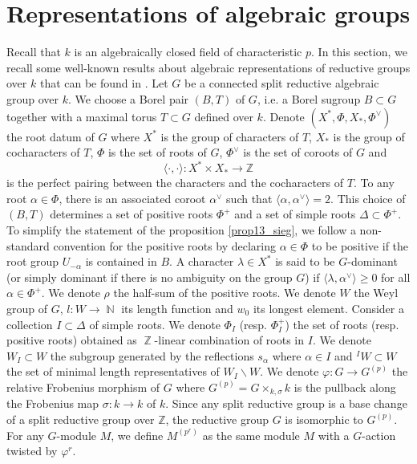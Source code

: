 \documentclass[11pt]{amsart}
\numberwithin{subsection}{section}
\numberwithin{figure}{section}
\numberwithin{table}{section}
\theoremstyle{1}
\theoremstyle{2}
\DeclareMathOperator{\Z}{\mathbb{Z}}
\DeclareMathOperator{\N}{\mathbb{N}}
\begin{document}
\section{Representations of algebraic groups}\label{sect_rep}
Recall that $k$ is an algebraically closed field of characteristic $p$. In this section, we recall some well-known results about algebraic representations of reductive groups over $k$ that can be found in \cite{MR2015057}. Let $G$ be a connected split reductive algebraic group over $k$. We choose a Borel pair $(B,T)$ of $G$, i.e. a Borel sugroup $B \subset G$ together with a maximal torus $T \subset G$ defined over $k$. Denote $(X^*,\Phi,X_*,\Phi^{\vee})$ the root datum of $G$ where $X^*$ is the group of characters of $T$, $X_*$ is the group of cocharacters of $T$, $\Phi$ is the set of roots of $G$, $\Phi^{\vee}$ is the set of coroots of $G$ and
\begin{equation*}
\langle \cdot ,\cdot \rangle : X^* \times X_* \rightarrow \mathbb{Z}
\end{equation*}
is the perfect pairing between the characters and the cocharacters of $T$. To any root $\alpha \in \Phi$, there is an associated coroot $\alpha^{\vee}$ such that $\langle \alpha, \alpha^{\vee} \rangle = 2$. This choice of $(B,T)$ determines a set of positive roots $\Phi^{+}$ and a set of simple roots $\Delta \subset \Phi^{+}$. To simplify the statement of the proposition \ref{prop13_sieg}, we follow a non-standard convention for the positive roots by declaring $\alpha \in \Phi$ to be positive if the root group $U_{-\alpha}$ is contained in $B$. A character $\lambda \in X^*$ is said to be $G$-dominant (or simply dominant if there is no ambiguity on the group $G$) if $\langle \lambda, \alpha^{\vee} \rangle \geq 0$ for all $\alpha \in \Phi^{+}$. We denote $\rho$ the half-sum of the positive roots. We denote $W$ the Weyl group of $G$, $l : W \rightarrow \N$ its length function and $w_0$ its longest element. Consider a collection $I \subset \Delta$ of simple roots. We denote $\Phi_I$ (resp. $\Phi_I^+$) the set of roots (resp. positive roots) obtained as $\Z$-linear combination of roots in $I$. We denote $W_I \subset W$ the subgroup generated by the reflections $s_{\alpha}$ where $\alpha \in I$ and ${}^IW \subset W$ the set of minimal length representatives of $W_I\backslash W$. We denote $\varphi : G \rightarrow G^{(p)}$ the relative Frobenius morphism of $G$ where $G^{(p)} = G \times_{k,\sigma} k$ is the pullback along the Frobenius map $\sigma : k \rightarrow k$ of $k$. Since any split reductive group is a base change of a split reductive group over $\mathbb{Z}$, the reductive group $G$ is isomorphic to $G^{(p)}$. For any $G$-module $M$, we define $M^{(p^r)}$ as the same module $M$ with a $G$-action twisted by $\varphi^r$. \\
\end{document}
